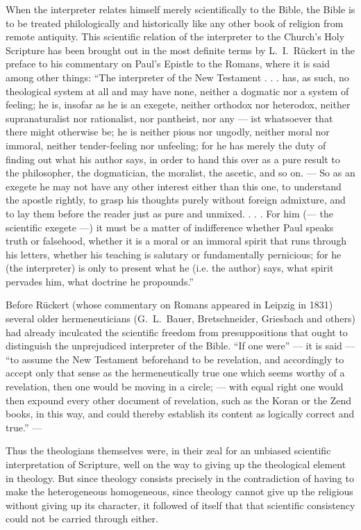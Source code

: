 \documentclass[12pt,a4paper]{book}
\begin{document}
When the interpreter relates himself merely scientifically to the Bible, the Bible is
to be treated philologically and historically like any other book of religion from
remote antiquity. This scientific relation of the interpreter to the Church's Holy
Scripture has been brought out in the most definite terms by L.\ I.\ Rückert in the
preface to his commentary on Paul's Epistle to the Romans, where it is said among
other things: ``The interpreter of the New Testament . . . has, as such, no
theological system at all and may have none, neither a dogmatic nor a system of
feeling; he is, insofar as he is an exegete, neither orthodox nor heterodox, neither
supranaturalist nor
rationalist, nor pantheist, nor any --- ist whatsoever that there might otherwise be;
he is neither pious nor ungodly, neither moral nor immoral, neither tender-feeling
nor unfeeling; for he has merely the duty of finding out what his author says, in
order to hand this over as a pure result to the philosopher, the dogmatician, the
moralist, the ascetic, and so on. --- So as an exegete he may not have any other
interest either than this one, to understand the apostle rightly, to grasp his
thoughts purely without foreign admixture, and to lay them before the reader just as
pure and unmixed. . . . For him (--- the scientific exegete ---) it must be a matter
of indifference whether Paul speaks truth or falsehood, whether it is a moral or an
immoral spirit that runs through his letters, whether his teaching is salutary or
fundamentally pernicious; for he (the interpreter) is only to present what he (i.e.
the author) says, what spirit pervades him, what doctrine he propounds.''

Before Rückert (whose commentary on Romans appeared in Leipzig in 1831) several older
hermeneuticians (G.\ L.\ Bauer, Bretschneider, Griesbach and others) had already
inculcated the scientific freedom from presuppositions that ought to distinguish the
unprejudiced interpreter of the Bible. ``If one were'' --- it is said --- ``to assume
the New Testament beforehand to be revelation, and accordingly to accept only that
sense as the hermeneutically true one which seems worthy of a revelation, then one
would be moving in a circle; --- with equal right one would then expound every other
document of revelation, such as the Koran or the Zend books, in this way, and could
thereby establish its content as logically correct and true.'' ---

Thus the theologians themselves were, in their zeal for an unbiased scientific
interpretation of Scripture, well on the way to giving up the theological element in
theology. But since theology consists precisely in the contradiction of having to
make the heterogeneous homogeneous, since theology cannot give up the religious
without giving up
its character, it followed of itself that that scientific consistency could not be
carried through either.
\end{document}
